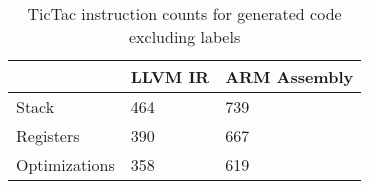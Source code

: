 \begin{table}[h!]
\centering
\begin{tabular}{p{}p{}p{}}
  \hline
 & LLVM IR & ARM Assembly \\ 
  \hline
Stack & 464 & 739 \\ 
  Registers & 390 & 667 \\ 
  Optimizations & 358 & 619 \\ 
   \hline
\end{tabular}
\caption{TicTac instruction counts for generated code excluding labels}
\end{table}
